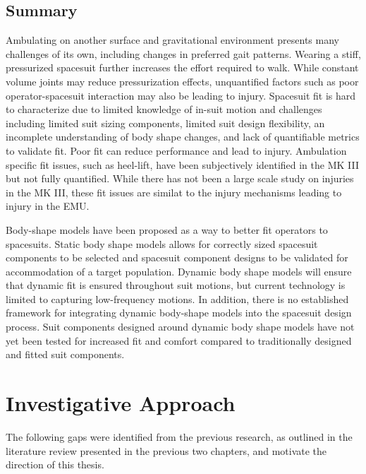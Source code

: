 \documentclass[defaultstyle,11pt]{thesis}
\begin{document}
\hypertarget{summary-1}{%
\section{Summary}\label{summary-1}}

Ambulating on another surface and gravitational environment presents many challenges of its own, including changes in preferred gait patterns.
Wearing a stiff, pressurized spacesuit further increases the effort required to walk.
While constant volume joints may reduce pressurization effects, unquantified factors such as poor operator-spacesuit interaction may also be leading to injury.
Spacesuit fit is hard to characterize due to limited knowledge of in-suit motion and challenges including limited suit sizing components, limited suit design flexibility, an incomplete understanding of body shape changes, and lack of quantifiable metrics to validate fit.
Poor fit can reduce performance and lead to injury.
Ambulation specific fit issues, such as heel-lift, have been subjectively identified in the MK III but not fully quantified.
While there has not been a large scale study on injuries in the MK III, these fit issues are similat to the injury mechanisms leading to injury in the EMU.

Body-shape models have been proposed as a way to better fit operators to spacesuits.
Static body shape models allows for correctly sized spacesuit components to be selected and spacesuit component designs to be validated for accommodation of a target population.
Dynamic body shape models will ensure that dynamic fit is ensured throughout suit motions, but current technology is limited to capturing low-frequency motions.
In addition, there is no established framework for integrating dynamic body-shape models into the spacesuit design process.
Suit components designed around dynamic body shape models have not yet been tested for increased fit and comfort compared to traditionally designed and fitted suit components.

\hypertarget{investigative-approach}{%
\chapter{Investigative Approach}\label{investigative-approach}}

The following gaps were identified from the previous research, as outlined in the literature review presented in the previous two chapters, and motivate the direction of this thesis.
\end{document}
